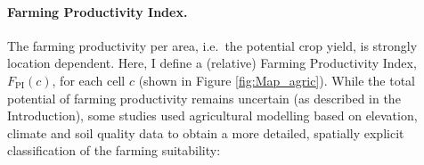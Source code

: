 \paragraph{Farming Productivity Index.}
The farming productivity per area, i.e.\ the potential crop yield, is strongly location dependent.
Here, I define a (relative) Farming Productivity Index, $F_\text{PI}(c)$, for each cell $c$ (shown in Figure \ref{fig:Map_agric}). 
While the total potential of farming productivity remains uncertain (as described in the Introduction), some studies used agricultural modelling based on elevation, climate and soil quality data to obtain a more detailed, spatially explicit classification of the farming suitability:
